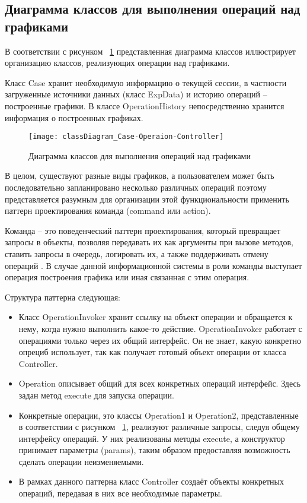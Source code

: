 \documentclass[14pt]{extreport}
\begin{document}
\subsection{Диаграмма классов для выполнения операций над графиками}
В соответствии с рисунком ~\ref{fig8} представленная диаграмма классов иллюстрирует организацию классов, реализующих операции над графиками.

Класс Case хранит необходимую информацию о текущей сессии, в частности загруженные источники данных (класс ExpData) и историю операций -- построенные графики. В классе OperationHistory непосредственно хранится информация о построенных графиках. 

\begin{figure}[H]
\centerline{\texttt{[image: classDiagram\_Case-Operaion-Controller]}}
\caption{Диаграмма классов для выполнения операций над графиками}
\label{fig8}
\end{figure}

В целом, существуют разные виды графиков, а пользователем может быть последовательно запланировано несколько различных операций поэтому представляется разумным для организации этой функциональности применить паттерн проектирования команда (command или action).

Команда -- это поведенческий паттерн проектирования, который превращает запросы в объекты, позволяя передавать их как аргументы при вызове методов, ставить запросы в очередь, логировать их, а также поддерживать отмену операций \cite{pattern}. В случае данной информационной системы в роли команды выступает операция построения графика или иная связанная с этим операция.

Структура паттерна следующая: 
\begin{itemize}
\item Класс OperationInvoker хранит ссылку на объект операции и обращается к нему, когда нужно выполнить какое-то действие. OperationInvoker работает с операциями только через их общий интерфейс. Он не знает, какую конкретно опрециб использует, так как получает готовый объект операции от класса Controller.

\item Operation описывает общий для всех конкретных операций интерфейс. Здесь задан метод execute для запуска операции.

\item Конкретные операции, это классы Operation1 и Operation2, представленные в соответствии с рисунком ~\ref{fig8}, реализуют различные запросы, следуя общему интерфейсу операций. У них реализованы методы execute, а конструктор принимает параметры (params), таким образом предоставляя возможность сделать операции неизменяемыми.

\item В рамках данного паттерна класс Controller создаёт объекты конкретных операций, передавая в них все необходимые параметры.
\end{itemize}
\end{document}
